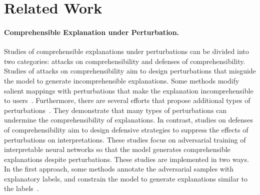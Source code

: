 \section{Related Work}
\label{section-Related Work}
\paragraph{Comprehensible Explanation under Perturbation.}
Studies of comprehensible explanations under perturbations can be divided into two categories: attacks on comprehensibility and defenses of comprehensibility.
Studies of attacks on comprehensibility aim to design perturbations that misguide the model to generate incomprehensible explanations.
Some methods modify salient mappings with perturbations that make the explanation incomprehensible to users~\citep{Ghorbani332019,dombrowski2022towards}. 
Furthermore, there are several efforts that propose additional types of perturbations~\citep{zhan2022towards,10.1609/aaai.v37i6.25847,Huai69352022}.
They demonstrate that many types of perturbations can undermine the comprehensibility of explanations. 
In contrast, studies on defenses of comprehensibility aim to design defensive strategies to suppress the effects of perturbations on interpretations.
These studies focus on adversarial training of interpretable neural networks so that the model generates comprehensible explanations despite perturbations. 
These studies are implemented in two ways. 
In the first approach, some methods annotate the adversarial samples with explanatory labels, and constrain the model to generate explanations similar to the labels~\citep{boopathy2020proper,lakkaraju2020robust,pmlr-v119-chalasani20a}.
